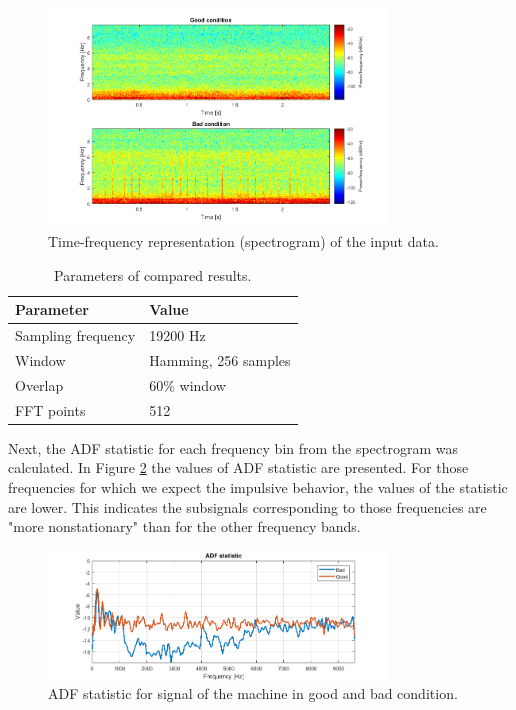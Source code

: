 \documentclass[11pt]{article}
\begin{document}
\begin{figure}[!ht]
\begin{center}
\includegraphics[width=0.8\textwidth]{spec.png}
\caption{Time-frequency representation (spectrogram) of the input data. \label{f:spec1}}
\end{center}
\end{figure}


\begin{table}[ht!]
    \centering
    \caption{Parameters of compared results.}
  \begin{tabular}{|l|l|}
    \hline
    \textbf{Parameter} & \textbf{Value} \\ \hline
         Sampling frequency & 19200 Hz \\ \hline
         Window & Hamming, 256 samples \\ \hline
         Overlap & $60\%$ window \\ \hline
         FFT points & 512 \\
    \hline
    \end{tabular}
    \label{tab:tab}
\end{table}

Next, the ADF statistic for each frequency bin from the spectrogram was calculated. In Figure \ref{f:stats} the values of ADF statistic are presented. For those frequencies for which we expect the impulsive behavior, the values of the statistic are lower. This indicates the subsignals corresponding to those frequencies are "more nonstationary" than for the other frequency bands.

\begin{figure}[!ht]
\begin{center}
\includegraphics[width=0.8\textwidth]{lozysko_stats1_2.png}
\caption{ADF statistic  for signal of the machine in good and bad condition. \label{f:stats}}
\end{center}
\end{figure}
\end{document}
